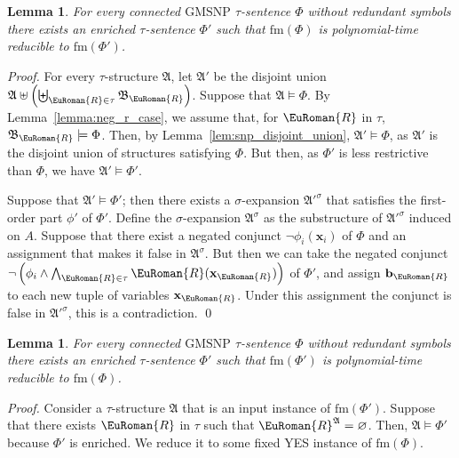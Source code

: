 \documentclass[10pt,a4paper]{amsart}
\theoremstyle{plain}
\newtheorem{lem}[thm]{Lemma}
\theoremstyle{definition}
\numberwithin{equation}{section}
\renewcommand{\proof}[1][Proof]{\par\noindent\textit{#1.}\enspace\ignorespaces}
\newcommand{\eurm}[1]{\EuRoman{#1}} %
\newcommand{\structure}[1]{\mathfrak{#1}} %
\newcommand{\tuple}[1]{\mathbf{#1}} %
\newcommand{\rel}[1]{\eurm{#1}} %
\newcommand{\Sat}[0]{\ensuremath{\mathrm{fm}}}
\newcommand{\GMSNP}[0]{\textrm{GMSNP}}
\begin{document}
\begin{lem}\label{lemma:non_empty_equiv1} 
For every connected $\GMSNP$ $\tau$-sentence $\Phi$ without redundant symbols there exists an enriched $\tau$-sentence $\Phi'$ such that $\Sat(\Phi)$ is polynomial-time reducible to $\Sat(\Phi')$.
\end{lem}
\proof
For every $\tau$-structure $\structure{A}$, let $\structure{A}'$ be the disjoint union $\structure{A} \uplus \left(\biguplus_{\rel{R}\in\tau}\structure{B}_\rel{R}\right)$.
Suppose that $\structure{A}\models\Phi$.
By Lemma~\ref{lemma:neg_r_case}, we assume that, for $\rel{R}$ in $\tau$, $\structure{B}_\rel{R}\models\Phi$.
Then, by Lemma~\ref{lem:snp_disjoint_union}, $\structure{A}'\models\Phi$, as $\structure{A}'$ is the disjoint union of structures satisfying $\Phi$.
But then, as $\Phi'$ is less restrictive than $\Phi$, we have $\structure{A}'\models\Phi'$.


Suppose that $\structure{A}'\models\Phi'$; then there exists a $\sigma$-expansion $\structure{A}'^\sigma$ that satisfies the first-order part $\phi'$ of $\Phi'$.
Define the $\sigma$-expansion $\structure{A}^\sigma$ as the substructure of $\structure{A}'^\sigma$ induced on $A$.
Suppose that there exist a negated conjunct $\neg\phi_i(\tuple{x}_i)$ of $\Phi$ and an assignment that makes it false in $\structure{A}^\sigma$.
But then we can take the negated conjunct $\neg\left(\phi_i\wedge \bigwedge_{\rel{R}\in\tau}\rel{R}(\tuple{x}_\rel{R})\right)$ of $\Phi'$, and assign $\tuple{b}_\rel{R}$ to each new tuple of variables $\tuple{x}_\rel{R}$.
Under this assignment the conjunct is false in $\structure{A}'^\sigma$, this is a contradiction.
\qed

\begin{lem}\label{lemma:non_empty_equiv2}
For every connected $\GMSNP$ $\tau$-sentence $\Phi$ without redundant symbols there exists an enriched $\tau$-sentence $\Phi'$ such that $\Sat(\Phi')$ is polynomial-time reducible to $\Sat(\Phi)$.
\end{lem}
\proof
Consider a $\tau$-structure $\structure{A}$ that is an input instance of $\Sat(\Phi')$.
Suppose that there exists $\rel{R}$ in $\tau$ such that $\rel{R}^\structure{A}=\varnothing$.
Then, $\structure{A}\models\Phi'$ because $\Phi'$ is enriched.
We reduce it to some fixed YES instance of $\Sat(\Phi)$.
\end{document}
